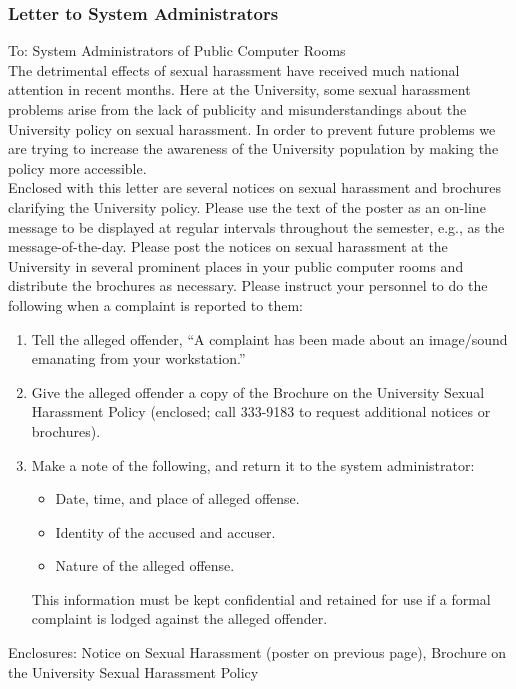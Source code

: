 \newpage
\subsubsection{Letter to System Administrators}

To: System Administrators of Public Computer Rooms\\

\noindent
The detrimental effects of sexual harassment have received much 
national attention in recent months. 
Here at the University, some sexual harassment problems 
arise from the lack of publicity and misunderstandings about the
University policy on sexual harassment.
In order to prevent future problems we are trying to 
increase the awareness of the University population 
by making the policy more accessible. \\

\noindent
Enclosed with this letter are several notices on sexual harassment
and brochures clarifying the University policy.
Please use the text of the poster as an on-line message to be
displayed at regular intervals throughout the semester,
e.g., as the message-of-the-day.
Please post the notices on sexual harassment at the University
in several prominent places in your public computer rooms and
distribute the brochures as necessary.
Please instruct your personnel to do the following when
a complaint is reported to them:

\begin{enumerate}
\item{Tell the alleged offender, ``A complaint has been made about an 
image/sound emanating from your workstation.''}
\item{Give the alleged offender a copy of the Brochure on the University 
Sexual Harassment Policy 
(enclosed; call 333-9183 to request additional notices or brochures).}
\item{Make a note of the following, and return it to
the system administrator:
\begin{itemize}
\item{Date, time, and place of alleged offense.}
\item{Identity of the accused and accuser.}
\item{Nature of the alleged offense.}
\end{itemize}
This information must be kept confidential and 
retained for use if a formal complaint is lodged against the alleged offender.}
\end{enumerate}

\vspace*{0.75in}
\noindent
Enclosures: Notice on Sexual Harassment (poster on previous page), 
Brochure on the University Sexual Harassment Policy 

